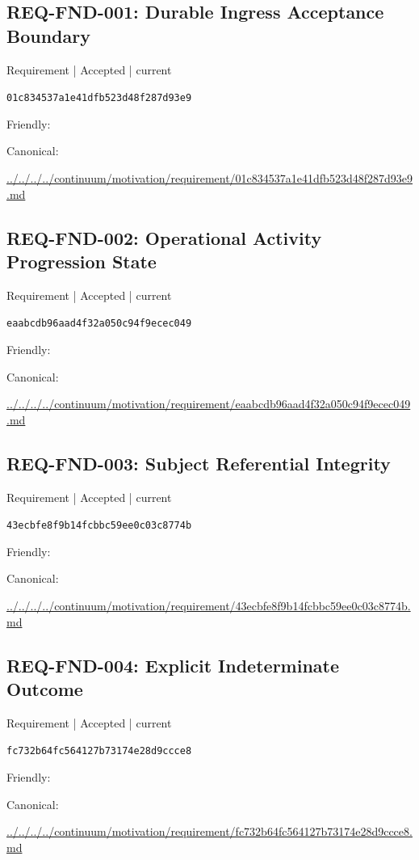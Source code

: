 \documentclass[10pt,a4paper]{article}
\begin{document}
\subsection*{REQ-FND-001: Durable Ingress Acceptance Boundary}
{\small Requirement | Accepted | current}\par
\texttt{01c834537a1e41dfb523d48f287d93e9}\par
Friendly: \par
Canonical: \par
{\footnotesize\url{../../../../continuum/motivation/requirement/01c834537a1e41dfb523d48f287d93e9.md}}\par
\subsection*{REQ-FND-002: Operational Activity Progression State}
{\small Requirement | Accepted | current}\par
\texttt{eaabcdb96aad4f32a050c94f9ecec049}\par
Friendly: \par
Canonical: \par
{\footnotesize\url{../../../../continuum/motivation/requirement/eaabcdb96aad4f32a050c94f9ecec049.md}}\par
\subsection*{REQ-FND-003: Subject Referential Integrity}
{\small Requirement | Accepted | current}\par
\texttt{43ecbfe8f9b14fcbbc59ee0c03c8774b}\par
Friendly: \par
Canonical: \par
{\footnotesize\url{../../../../continuum/motivation/requirement/43ecbfe8f9b14fcbbc59ee0c03c8774b.md}}\par
\subsection*{REQ-FND-004: Explicit Indeterminate Outcome}
{\small Requirement | Accepted | current}\par
\texttt{fc732b64fc564127b73174e28d9ccce8}\par
Friendly: \par
Canonical: \par
{\footnotesize\url{../../../../continuum/motivation/requirement/fc732b64fc564127b73174e28d9ccce8.md}}\par
\end{document}
